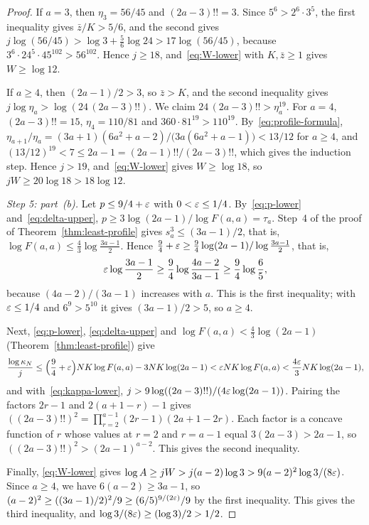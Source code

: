 \begin{proof}
If \(a=3\), then \(\eta_3=56/45\) and \((2a-3)!!=3\). Since
\(5^6>2^6\cdot3^5\), the first inequality gives \(\bar z/K>5/6\), and the
second gives \(j\log(56/45)>\log3+\frac56\log24>17\log(56/45)\), because
\(3^6\cdot24^5\cdot45^{102}>56^{102}\). Hence \(j\ge18\),
and~\eqref{eq:W-lower} with \(K,\bar z\ge1\) gives \(W\ge\log12\).

If \(a\ge4\), then \((2a-1)/2>3\), so \(\bar z>K\), and the second
inequality gives \(j\log\eta_a>\log(24\,(2a-3)!!)\). We claim
\(24\,(2a-3)!!>\eta_a^{19}\). For \(a=4\), \((2a-3)!!=15\),
\(\eta_4=110/81\) and \(360\cdot81^{19}>110^{19}\).
By~\eqref{eq:profile-formula},
\(\eta_{a+1}/\eta_a=(3a+1)(6a^2+a-2)/\bigl(3a(6a^2+a-1)\bigr)<13/12\)
for \(a\ge4\), and \((13/12)^{19}<7\le2a-1=(2a-1)!!/(2a-3)!!\), which
gives the induction step. Hence \(j>19\), and~\eqref{eq:W-lower} gives
\(W\ge\log18\), so \(jW\ge20\log18>18\log12\).

\emph{Step 5: part~(b).} Let \(p\le9/4+\varepsilon\) with \(0<\varepsilon\le1/4\).
By~\eqref{eq:p-lower} and~\eqref{eq:delta-upper},
\(p\ge3\log(2a-1)/\log F(a,a)=\tau_a\). Step~4 of the proof of
Theorem~\ref{thm:least-profile} gives \(s_a^3\le(3a-1)/2\), that is,
\(\log F(a,a)\le\frac43\log\frac{3a-1}2\). Hence
\(\frac94+\varepsilon\ge\frac94\log(2a-1)/\log\frac{3a-1}2\), that is,
\[
 \varepsilon\log\frac{3a-1}2\ge\frac94\log\frac{4a-2}{3a-1}\ge\frac94\log\frac65,
\]
because \((4a-2)/(3a-1)\) increases with \(a\). This is the first
inequality; with \(\varepsilon\le1/4\) and \(6^9>5^{10}\) it gives
\((3a-1)/2>5\), so \(a\ge4\).

Next, \eqref{eq:p-lower}, \eqref{eq:delta-upper} and
\(\log F(a,a)<\frac43\log(2a-1)\) (Theorem~\ref{thm:least-profile}) give
\[
 \frac{\log\kappa_N}j
 \le\Bigl(\frac94+\varepsilon\Bigr)NK\log F(a,a)-3NK\log(2a-1)
 <\varepsilon NK\log F(a,a)<\frac{4\varepsilon}3NK\log(2a-1),
\]
and with~\eqref{eq:kappa-lower},
\(j>9\log((2a-3)!!)/(4\varepsilon\log(2a-1))\). Pairing the factors \(2r-1\) and
\(2(a+1-r)-1\) gives
\(((2a-3)!!)^2=\prod_{r=2}^{a-1}(2r-1)(2a+1-2r)\). Each factor is a
concave function of \(r\) whose values at \(r=2\) and \(r=a-1\) equal
\(3(2a-3)>2a-1\), so \(((2a-3)!!)^2>(2a-1)^{a-2}\). This gives the second
inequality.

Finally, \eqref{eq:W-lower} gives
\(\log A\ge jW>j(a-2)\log3>9(a-2)^2\log3/(8\varepsilon)\). Since
\(a\ge4\), we have \(6(a-2)\ge3a-1\), so
\((a-2)^2\ge((3a-1)/2)^2/9\ge(6/5)^{9/(2\varepsilon)}/9\)
by the first inequality. This gives the third inequality, and
\(\log3/(8\varepsilon)\ge(\log3)/2>1/2\).
\end{proof}


